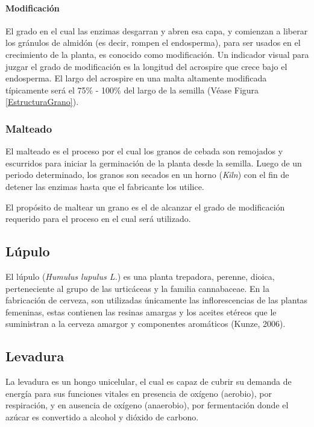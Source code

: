     	        \paragraph{Modificación}
    	        El grado en el cual las enzimas desgarran y abren esa capa, y comienzan a liberar los gránulos de almidón (es decir, rompen el endosperma), para ser usados en el crecimiento de la planta, es conocido como modificación. Un indicador visual para juzgar el grado de modificación es la longitud del acrospire que crece bajo el endosperma. El largo del acrospire en una malta altamente modificada típicamente será el 75\% - 100\% del largo de la semilla (Véase Figura \ref{EstructuraGrano}). 
    	    \subsubsection{Malteado}
    	        \par El malteado es el proceso por el cual los granos de cebada son remojados y escurridos para iniciar la germinación de la planta desde la semilla. Luego de un periodo determinado, los granos son secados en un horno (\textit{Kiln}) con el fin de detener las enzimas hasta que el fabricante los utilice.
    	        
    	        \par El propósito de maltear un grano es el de alcanzar el grado de modificación requerido para el proceso en el cual será utilizado.
    	   
        \subsection{Lúpulo}
            \par El lúpulo (\textit{Humulus lupulus  L.}) es una planta trepadora, perenne, dioica, perteneciente al grupo de las urticáceas y la familia cannabaceae. En la fabricación de cerveza, son utilizadas únicamente las inflorescencias de las plantas femeninas, estas contienen las resinas amargas y los aceites etéreos que le suministran a la cerveza amargor y componentes aromáticos (Kunze, 2006).
            
        \subsection{Levadura}
            \par La levadura es un hongo unicelular, el cual es capaz de cubrir su demanda de energía para sus funciones vitales en presencia de oxígeno (aerobio), por respiración, y en ausencia de oxígeno (anaerobio), por fermentación donde el azúcar es convertido a alcohol y dióxido de carbono.
            
